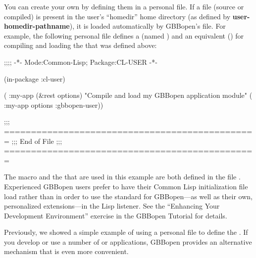 \documentclass[10pt,twoside,english,pdftex]{article}
\begin{document}
%
%
%
%
%
%
You can create your own  by defining them in a personal
 file.  If a  file (source
or compiled) is present in the user's ``homedir'' home directory (as defined
by \textbf{user-homedir-pathname}), it is loaded automatically by GBBopen's
 file.  For example, the following personal
 file defines a  (named
) and an equivalent  ()
for compiling and loading the   that was defined
above:
%
\W\supp\notpretop
\begin{example}
  ;;;; -*- Mode:Common-Lisp; Package:CL-USER -*-

  (in-package :cl-user)

  ( :my-app (&rest options)
    "Compile and load my GBBopen application module"
    ( :my-app options :gbbopen-user))

  ;;; ===============================================
  ;;;   End of File
  ;;; ===============================================
\end{example}
%
The macro  and the 
 that are used in this example are both defined in the
file .  Experienced GBBopen
users prefer to have their Common Lisp initialization file load
 rather than
 in order to use the standard
 for GBBopen---as well as their own, personalized
extensions---in the Lisp listener.  See the ``Enhancing Your Development
Environment'' exercise in the GBBopen Tutorial for details.

\label{sec:personal-gbbopen-modules-directory}

%
%
%
%
%
%
Previously, we showed a simple example of using a personal
 file to define the  .  If
you develop or use a number of  or applications, GBBopen
provides an alternative mechanism that is even more convenient.
\end{document}

